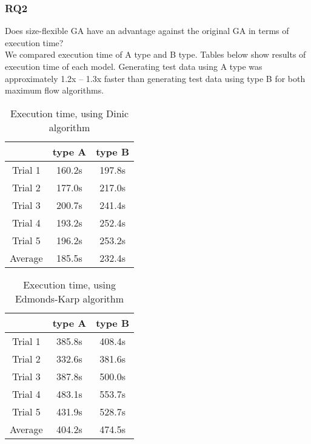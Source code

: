 \documentclass[a4paper, 10pt, conference]{ieeeconf}      %
\begin{document}
\subsubsection*{RQ2} Does size-flexible GA have an advantage against the original GA in terms of execution time?\\
We compared execution time of A type and B type. Tables below show results of execution time of each model. Generating test data using A type was approximately 1.2x -- 1.3x faster than generating test data using type B for both maximum flow algorithms. 

\begin{table}[H]
\begin{center}
    \begin{tabular}{|c|c|c|}
         \hline
          & type A & type B \\\hline
         Trial 1 & 160.2s & 197.8s \\\hline
         Trial 2 & 177.0s & 217.0s \\\hline
         Trial 3 & 200.7s & 241.4s \\\hline 
         Trial 4 & 193.2s & 252.4s \\\hline
         Trial 5 & 196.2s & 253.2s \\\hline\hline
         Average & 185.5s & 232.4s \\\hline
    \end{tabular}
    \caption{Execution time, using Dinic algorithm}
\end{center}
\end{table}


\begin{table}[H]
\begin{center}
    \begin{tabular}{|c|c|c|}
         \hline
          & type A & type B \\\hline
         Trial 1 & 385.8s & 408.4s \\\hline
         Trial 2 & 332.6s & 381.6s \\\hline
         Trial 3 & 387.8s & 500.0s \\\hline 
         Trial 4 & 483.1s & 553.7s \\\hline
         Trial 5 & 431.9s & 528.7s \\\hline\hline
         Average & 404.2s & 474.5s \\\hline
    \end{tabular}
    \caption{Execution time, using Edmonds-Karp algorithm}
\end{center}
\end{table}
\end{document}
